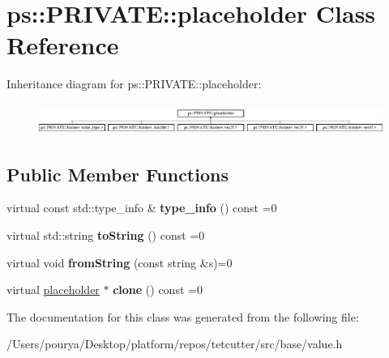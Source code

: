 \hypertarget{classps_1_1PRIVATE_1_1placeholder}{}\section{ps\+:\+:P\+R\+I\+V\+A\+T\+E\+:\+:placeholder Class Reference}
\label{classps_1_1PRIVATE_1_1placeholder}
Inheritance diagram for ps\+:\+:P\+R\+I\+V\+A\+T\+E\+:\+:placeholder\+:\begin{figure}[H]
\begin{center}
\leavevmode
\includegraphics[height=1.022831cm]{classps_1_1PRIVATE_1_1placeholder}
\end{center}
\end{figure}
\subsection*{Public Member Functions}
\begin{DoxyCompactItemize}
\item 
\hypertarget{classps_1_1PRIVATE_1_1placeholder_a9adbf80e1db70fd00b277caa989562d0}{}virtual const std\+::type\+\_\+info \& {\bfseries type\+\_\+info} () const  =0\label{classps_1_1PRIVATE_1_1placeholder_a9adbf80e1db70fd00b277caa989562d0}

\item 
\hypertarget{classps_1_1PRIVATE_1_1placeholder_a11b34acb340ba7343a22a3739c8651b7}{}virtual std\+::string {\bfseries to\+String} () const  =0\label{classps_1_1PRIVATE_1_1placeholder_a11b34acb340ba7343a22a3739c8651b7}

\item 
\hypertarget{classps_1_1PRIVATE_1_1placeholder_ace197f0ced6be12bf6e3e6a2586e6310}{}virtual void {\bfseries from\+String} (const string \&s)=0\label{classps_1_1PRIVATE_1_1placeholder_ace197f0ced6be12bf6e3e6a2586e6310}

\item 
\hypertarget{classps_1_1PRIVATE_1_1placeholder_a80719280a6ff9740cd629be55ba02261}{}virtual \hyperlink{classps_1_1PRIVATE_1_1placeholder}{placeholder} $\ast$ {\bfseries clone} () const  =0\label{classps_1_1PRIVATE_1_1placeholder_a80719280a6ff9740cd629be55ba02261}

\end{DoxyCompactItemize}


The documentation for this class was generated from the following file\+:\begin{DoxyCompactItemize}
\item 
/\+Users/pourya/\+Desktop/platform/repos/tetcutter/src/base/value.\+h\end{DoxyCompactItemize}

